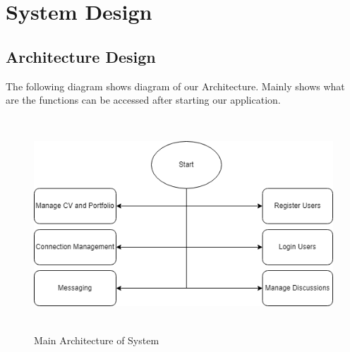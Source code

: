 \section{System Design}
\subsection{Architecture Design}
The following diagram shows diagram of our Architecture. Mainly shows what are the functions can be accessed after starting our application.
\begin{figure}[H]
    \includegraphics[height = 8cm]{Diagrams/Main_Block.png}
    \caption{Main Architecture of System}
\end{figure}
\newpage
